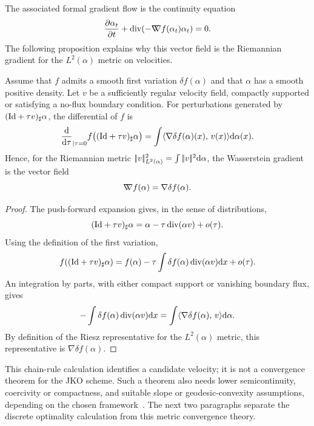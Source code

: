 The associated formal gradient flow is the continuity equation
\begin{equation}
    \frac{\partial \alpha_t}{\partial t} + \operatorname{div}(-\mathord{\nabla\mkern-9.3mu\nabla} f(\alpha_t) \alpha_t) = 0. \label{eq:wassflow-pde}
\end{equation}
The following proposition explains why this vector field is the Riemannian gradient for the $L^2(\alpha)$ metric on velocities.
%
\begin{proposition}\label{prop-formal-wass-gradient}
	Assume that $f$ admits a smooth first variation $\delta f(\alpha)$ and that $\alpha$ has a smooth positive density. Let $v$ be a sufficiently regular velocity field, compactly supported or satisfying a no-flux boundary condition. For perturbations generated by $(\mathrm{Id}+\tau v)_\sharp\alpha$, the differential of $f$ is
	\[
		\frac{\mathrm{d}}{\mathrm{d}\tau}_{|\tau=0}
		f\big((\mathrm{Id}+\tau v)_\sharp\alpha\big)
		=
		\int \langle \nabla \delta f(\alpha)(x),\,v(x)\rangle\mathrm{d}\alpha(x).
	\]
	Hence, for the Riemannian metric $|\!| v |\!|_{L^2(\alpha)}^2=\int |\!| v |\!|^2\mathrm{d}\alpha$, the Wasserstein gradient is the vector field
	\[
		\mathord{\nabla\mkern-9.3mu\nabla} f(\alpha)=\nabla \delta f(\alpha).
	\]
\end{proposition}
\begin{proof}
	The push-forward expansion gives, in the sense of distributions,
	\[
		(\mathrm{Id}+\tau v)_\sharp\alpha
		=
		\alpha-\tau\operatorname{div}(\alpha v)+o(\tau).
	\]
	Using the definition of the first variation,
	\[
		f((\mathrm{Id}+\tau v)_\sharp\alpha)
		=
		f(\alpha)-\tau\int \delta f(\alpha)\operatorname{div}(\alpha v)\mathrm{d} x+o(\tau).
	\]
	An integration by parts, with either compact support or vanishing boundary flux, gives
	\[
		-\int \delta f(\alpha)\operatorname{div}(\alpha v)\mathrm{d} x
		=
		\int \langle \nabla\delta f(\alpha),\,v\rangle\mathrm{d}\alpha.
	\]
	By definition of the Riesz representative for the $L^2(\alpha)$ metric, this representative is $\nabla\delta f(\alpha)$.
\end{proof}

This chain-rule calculation identifies a candidate velocity; it is not a convergence theorem for the JKO scheme. Such a theorem also needs lower semicontinuity, coercivity or compactness, and suitable slope or geodesic-convexity assumptions, depending on the chosen framework~\cite{jordan1998variational,ambrosio2006gradient}. The next two paragraphs separate the discrete optimality calculation from this metric convergence theory.

